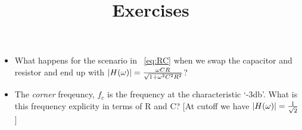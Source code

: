 \par
\title{\large{Exercises}}
\begin{itemize}
\item What happens for the scenario in ~\ref{eq:RC} when we swap the capacitor and resistor and end up with \begin{math}\abs{H(\omega)} = \frac{\omega CR}{\sqrt{1 + \omega^{2}C^{2}R^{2}}}\end{math}? 
\item The \textit{corner} freqeuncy, $f_c$ is the frequency at the characteristic `-3db'.  What is this frequency explicity in terms of R and C? [At cutoff we have \begin{math} \abs{H(\omega)} = \frac{1}{\sqrt{2}} \end{math}]
\end{itemize}

